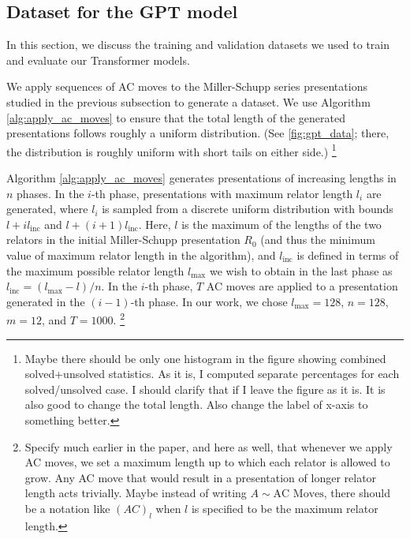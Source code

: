 \subsection{Dataset for the GPT model}

In this section, we discuss the training and validation datasets we used to train and evaluate our Transformer models. 

We apply sequences of AC moves to the Miller-Schupp series presentations studied in the previous subsection to generate a dataset.
We use Algorithm \autoref{alg:apply_ac_moves} to ensure that the total length of the generated presentations follows roughly a uniform distribution.
(See \autoref{fig:gpt_data}; there, the distribution is roughly uniform with short tails on either side.)
\footnote{Maybe there should be only one histogram in the figure showing combined solved+unsolved statistics.
As it is, I computed separate percentages for each solved/unsolved case.
I should clarify that if I leave the figure as it is.
It is also good to change the total length.
Also change the label of x-axis to something better.}

Algorithm \autoref{alg:apply_ac_moves} generates presentations of increasing lengths in $n$ phases.
In the $i$-th phase, presentations with maximum relator length $l_i$ are generated, where $l_i$ is sampled from a discrete uniform distribution with bounds $l + i l_{\text{inc}} $ and $l + (i+1) l_{\text{inc}}$.
Here, $l$ is the maximum of the lengths of the two relators in the initial Miller-Schupp presentation $R_0$ (and thus the minimum value of maximum relator length in the algorithm), and $l_{\text{inc}}$ is defined in terms of the maximum possible relator length $l_{\text{max}}$ we wish to obtain in the last phase as $l_{\text{inc}} = (l_{\text{max}}-l)/n$.
In the $i$-th phase, $T$ AC moves are applied to a presentation generated in the $(i-1)$-th phase.
In our work, we chose $l_{\text{max}}=128$, $n=128$, $m=12$, and $T=1000$.
\footnote{Specify much earlier in the paper, and here as well, that whenever we apply AC moves, we set a maximum length up to which each relator is allowed to grow.
Any AC move that would result in a presentation of longer relator length acts trivially.
Maybe instead of writing $A \sim \text{AC Moves}$, there should be a notation like $(AC)_l$ when $l$ is specified to be the maximum relator length.}

